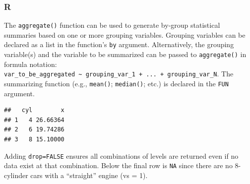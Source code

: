 \documentclass[
]{book}
\newenvironment{Shaded}{\begin{snugshade}}{\end{snugshade}}
\newcommand{\AttributeTok}[1]{\textcolor[rgb]{0.77,0.63,0.00}{#1}}
\newcommand{\CommentTok}[1]{\textcolor[rgb]{0.56,0.35,0.01}{\textit{#1}}}
\newcommand{\ConstantTok}[1]{\textcolor[rgb]{0.00,0.00,0.00}{#1}}
\newcommand{\FunctionTok}[1]{\textcolor[rgb]{0.00,0.00,0.00}{#1}}
\newcommand{\NormalTok}[1]{#1}
\newcommand{\SpecialCharTok}[1]{\textcolor[rgb]{0.00,0.00,0.00}{#1}}
\newcommand{\StringTok}[1]{\textcolor[rgb]{0.31,0.60,0.02}{#1}}
\begin{document}
\hypertarget{r-39}{%
\subsubsection*{R}\label{r-39}}

The \texttt{aggregate()} function can be used to generate by-group statistical summaries based on one or more grouping variables. Grouping variables can be declared as a list in the function's \texttt{by} argument. Alternatively, the grouping variable(s) and the variable to be summarized can be passed to \texttt{aggregate()} in formula notation: \texttt{var\_to\_be\_aggregated\ \textasciitilde{}\ grouping\_var\_1\ +\ ...\ +\ grouping\_var\_N}. The summarizing function (e.g., \texttt{mean()}; \texttt{median()}; etc.) is declared in the \texttt{FUN} argument.

\begin{Shaded}
\end{Shaded}

\begin{verbatim}
##   cyl        x
## 1   4 26.66364
## 2   6 19.74286
## 3   8 15.10000
\end{verbatim}

Adding \texttt{drop=FALSE} ensures all combinations of levels are returned even if no data exist at that combination. Below the final row is \texttt{NA} since there are no 8-cylinder cars with a ``straight'' engine (vs = 1).

\begin{Shaded}
\end{Shaded}
\end{document}
